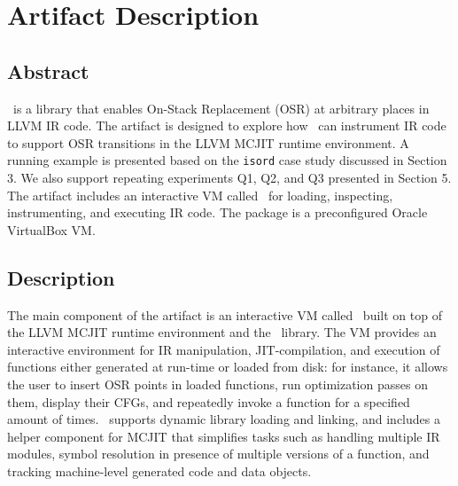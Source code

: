
%
%



\appendix
\section{Artifact Description}



\subsection{Abstract}

\osrkit\ is a library that enables On-Stack Replacement (OSR) at arbitrary places in LLVM IR code. The artifact is designed to explore how \osrkit\ can instrument IR code to support OSR transitions in the LLVM MCJIT runtime environment. A running example is presented based on the \texttt{isord} case study discussed in Section 3. We also support repeating experiments Q1, Q2, and Q3 presented in Section 5. The artifact includes an interactive VM called \tinyvm\ for loading, inspecting, instrumenting, and executing IR code. The package is a preconfigured Oracle VirtualBox VM.


\subsection{Description}

The main component of the artifact is an interactive VM called \tinyvm\ built on top of the LLVM MCJIT runtime environment and the \osrkit\ library. The VM provides an interactive environment for IR manipulation, JIT-compilation, and execution of functions either generated at run-time or loaded from disk: for instance, it allows the user to insert OSR points in loaded functions, run optimization passes on them, display their CFGs, and repeatedly invoke a function for a specified amount of times. \tinyvm\ supports dynamic library loading and linking, and includes a helper component for MCJIT that simplifies tasks such as handling multiple IR modules, symbol resolution in presence of multiple versions of a function, and tracking machine-level generated code and data objects.

